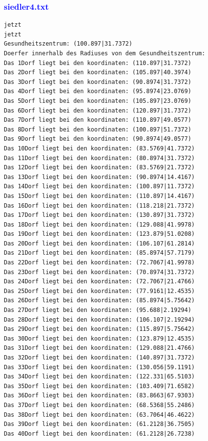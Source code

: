 \documentclass{article}
\begin{document}
\subsubsection{\textcolor{blue}{siedler4.txt}}
\begin{verbatim}
jetzt
jetzt
Gesundheitszentrum: (100.897|31.7372)
Doerfer innerhalb des Radiuses von dem Gesundheitszentrum: 
Das 1Dorf liegt bei den koordinaten: (110.897|31.7372)
Das 2Dorf liegt bei den koordinaten: (105.897|40.3974)
Das 3Dorf liegt bei den koordinaten: (90.8974|31.7372)
Das 4Dorf liegt bei den koordinaten: (95.8974|23.0769)
Das 5Dorf liegt bei den koordinaten: (105.897|23.0769)
Das 6Dorf liegt bei den koordinaten: (120.897|31.7372)
Das 7Dorf liegt bei den koordinaten: (110.897|49.0577)
Das 8Dorf liegt bei den koordinaten: (100.897|51.7372)
Das 9Dorf liegt bei den koordinaten: (90.8974|49.0577)
Das 10Dorf liegt bei den koordinaten: (83.5769|41.7372)
Das 11Dorf liegt bei den koordinaten: (80.8974|31.7372)
Das 12Dorf liegt bei den koordinaten: (83.5769|21.7372)
Das 13Dorf liegt bei den koordinaten: (90.8974|14.4167)
Das 14Dorf liegt bei den koordinaten: (100.897|11.7372)
Das 15Dorf liegt bei den koordinaten: (110.897|14.4167)
Das 16Dorf liegt bei den koordinaten: (118.218|21.7372)
Das 17Dorf liegt bei den koordinaten: (130.897|31.7372)
Das 18Dorf liegt bei den koordinaten: (129.088|41.9978)
Das 19Dorf liegt bei den koordinaten: (123.879|51.0208)
Das 20Dorf liegt bei den koordinaten: (106.107|61.2814)
Das 21Dorf liegt bei den koordinaten: (85.8974|57.7179)
Das 22Dorf liegt bei den koordinaten: (72.7067|41.9978)
Das 23Dorf liegt bei den koordinaten: (70.8974|31.7372)
Das 24Dorf liegt bei den koordinaten: (72.7067|21.4766)
Das 25Dorf liegt bei den koordinaten: (77.9161|12.4535)
Das 26Dorf liegt bei den koordinaten: (85.8974|5.75642)
Das 27Dorf liegt bei den koordinaten: (95.688|2.19294)
Das 28Dorf liegt bei den koordinaten: (106.107|2.19294)
Das 29Dorf liegt bei den koordinaten: (115.897|5.75642)
Das 30Dorf liegt bei den koordinaten: (123.879|12.4535)
Das 31Dorf liegt bei den koordinaten: (129.088|21.4766)
Das 32Dorf liegt bei den koordinaten: (140.897|31.7372)
Das 33Dorf liegt bei den koordinaten: (130.056|59.1191)
Das 34Dorf liegt bei den koordinaten: (122.331|65.5103)
Das 35Dorf liegt bei den koordinaten: (103.409|71.6582)
Das 36Dorf liegt bei den koordinaten: (83.8663|67.9303)
Das 37Dorf liegt bei den koordinaten: (68.5368|55.2486)
Das 38Dorf liegt bei den koordinaten: (63.7064|46.4622)
Das 39Dorf liegt bei den koordinaten: (61.2128|36.7505)
Das 40Dorf liegt bei den koordinaten: (61.2128|26.7238)

\end{verbatim}
\end{document}
